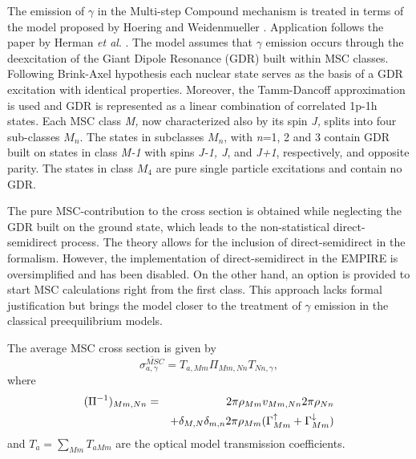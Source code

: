 The emission of $\gamma$ in the Multi-step Compound%
 mechanism is treated in terms of the model proposed by Hoering
and Weidenmueller \cite{GammaMSC}. Application follows the paper by Herman
\emph{et al}. \cite{GammaMSCapp}. The model assumes that $\gamma$ emission
occurs through the deexcitation of the Giant Dipole Resonance (GDR) built
within MSC%
 classes. Following Brink-Axel hypothesis \cite{Axel,Brink,Brinka}
each nuclear state serves as the basis of a GDR excitation with identical
properties. Moreover, the Tamm-Dancoff approximation is used and GDR is
represented as a linear combination of correlated 1p-1h states. Each MSC
class \emph{M,} now characterized also by its spin \emph{J,} splits into
four sub-classes $M_{n}$. The states in subclasses $M_{n}$, with \emph{n}=1,
2 and 3 contain GDR built on states in class \emph{M-1} with spins \emph{%
J-1, J}, and \emph{J+1}, respectively, and opposite parity. The states in
class $M_{4}$ are pure single particle excitations and contain no GDR.

The pure MSC-contribution to the cross section is obtained while neglecting
the GDR built on the ground state, which leads to the non-statistical
direct-semidirect process. The theory \cite{GammaMSC} allows for the
inclusion of direct-semidirect in the formalism. However, the implementation
of direct-semidirect in the EMPIRE is oversimplified and has been disabled.
On the other hand, an option is provided to start MSC%
 calculations right from the first class. This approach lacks
formal justification but brings the model closer to the treatment of $\gamma$
emission in the classical preequilibrium models.

The average MSC cross section is given by
\begin{equation}
\overline{\sigma_{a,\gamma}^{MSC}}=T_{a,Mm}\Pi_{Mm,Nn}T_{Nn,\gamma},
\label{GammaMSCxs}
\end{equation}
where
\begin{eqnarray}
(\Pi^{-1})_{Mm,Nn} & = & 2\pi\rho_{Mm}v_{Mm,Nn}2\pi\rho_{Nn}  \notag \\
& &
+\delta_{M,N}\delta_{m,n}2\pi\rho_{Mm}(\Gamma_{Mm}^{\uparrow}+\Gamma_{Mm}^{%
\downarrow})  \label{Pigamma}
\end{eqnarray}
and $T_{a}=\sum_{Mm}T_{aMm}$ are the optical model transmission coefficients.


